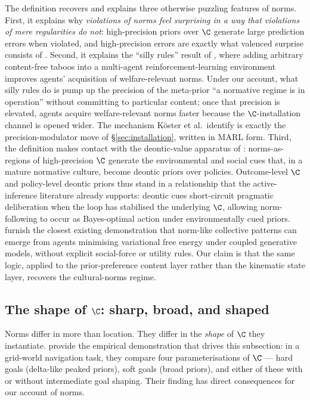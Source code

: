 The definition recovers and explains three otherwise puzzling features of
norms. First, it explains why \emph{violations of norms feel surprising in a
way that violations of mere regularities do not}: high-precision priors over
$\C$ generate large prediction errors when violated, and high-precision
errors are exactly what valenced surprise consists of
\citep{hesp2021DeeplyFelt}. Second, it explains the ``silly rules'' result of
\citet{koster2022SillyRules}, where adding arbitrary content-free taboos
into a multi-agent reinforcement-learning environment improves agents'
acquisition of welfare-relevant norms. Under our account, what silly rules
do is pump up the precision of the meta-prior ``a normative regime is in
operation'' without committing to particular content; once that precision is
elevated, agents acquire welfare-relevant norms faster because the
$\C$-installation channel is opened wider. The mechanism Köster et al.\
identify is exactly the precision-modulator move of \S\ref{sec:installation},
written in MARL form. Third, the definition makes contact with the
deontic-value apparatus of \citet{constant2019Regimes}: norms-as-regions of
high-precision $\C$ generate the environmental and social cues that, in a
mature normative culture, become deontic priors over policies.
Outcome-level $\C$ and policy-level deontic priors thus stand in a
relationship that the active-inference literature already supports: deontic
cues short-circuit pragmatic deliberation when the loop has stabilised the
underlying $\C$, allowing norm-following to occur as Bayes-optimal action
under environmentally cued priors. \citet{heins2024CollectiveSurprise}
furnish the closest existing demonstration that norm-like collective
patterns can emerge from agents minimising variational free energy under
coupled generative models, without explicit social-force or utility rules.
Our claim is that the same logic, applied to the prior-preference content
layer rather than the kinematic state layer, recovers the cultural-norms
regime.

\subsection{The shape of $\C$: sharp, broad, and shaped}
\label{sec:shape-of-C}

Norms differ in more than location. They differ in the \emph{shape} of $\C$
they instantiate. \citet{torresan2025ShapeC} provide the empirical
demonstration that drives this subsection: in a grid-world navigation task,
they compare four parameterisations of $\C$ --- hard goals (delta-like
peaked priors), soft goals (broad priors), and either of these with or
without intermediate goal shaping. Their finding has direct consequences for
our account of norms.

